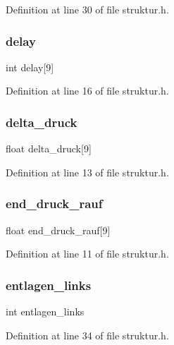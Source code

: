 Definition at line 30 of file struktur.\+h.

\mbox{\label{structramp1_aedbeaf5af87649bce097829649b24392}} 
\subsubsection{delay}
{\footnotesize\ttfamily int delay[9]}



Definition at line 16 of file struktur.\+h.

\mbox{\label{structramp1_ab5b9e38244f73e5ffcb5e77ebf122adb}} 
\subsubsection{delta\+\_\+druck}
{\footnotesize\ttfamily float delta\+\_\+druck[9]}



Definition at line 13 of file struktur.\+h.

\mbox{\label{structramp1_ac11fedf60ac38f99291148846c40799a}} 
\subsubsection{end\+\_\+druck\+\_\+rauf}
{\footnotesize\ttfamily float end\+\_\+druck\+\_\+rauf[9]}



Definition at line 11 of file struktur.\+h.

\mbox{\label{structramp1_ab4b20bab65e979ae25968d8621faf098}} 
\subsubsection{entlagen\+\_\+links}
{\footnotesize\ttfamily int entlagen\+\_\+links}



Definition at line 34 of file struktur.\+h.

\mbox{\label{structramp1_a24c2213964d0c327d3efaeb67a1075aa}} 
